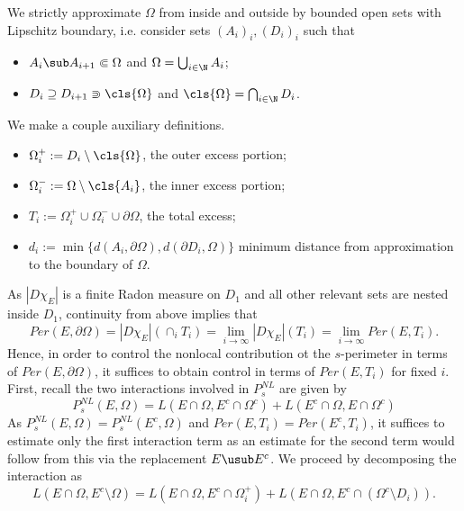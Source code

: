 \documentclass[../main.tex]{subfiles}
\begin{document}
We strictly approximate $ \Omega $ from inside and outside by bounded open sets with Lipschitz boundary, i.e. consider sets $ (A_{i})_{i}, (D_{i})_{i} $ such that
\begin{itemize}
    \item $ A_{i}\sub A_{i+1} \Subset \Omega $ and $ \Omega = \bigcup_{i\in\N}A_{i} $;
    \item $ D_{i}\supseteq D_{i+1}\Supset \cls{\Omega}  $ and $ \cls{\Omega} = \bigcap_{i\in\N}D_{i}$.
\end{itemize}
We make a couple auxiliary definitions.
\begin{itemize}
    \item $ \Omega_{i}^{+} := D_{i}\setminus \cls{\Omega} $, the outer excess portion;
    \item $ \Omega_{i}^{-} := \Omega\setminus \cls{A_{i}} $, the inner excess portion;
    \item $ T_{i}:= \Omega_{i}^{+}\cup \Omega_{i}^{-} \cup \partial \Omega $, the total excess;
    \item $ d_{i}:= \min\{d(A_{i}, \partial \Omega), d(\partial D_{i},  \Omega) \} $ minimum distance from approximation to the boundary of $ \Omega $.
\end{itemize}



\vspace{1.6mm}
As $ |D \chi_{E}| $ is a finite Radon measure on $ D_{1} $ and all other relevant sets are nested inside $ D_{1} $, continuity from above implies that
\[
    Per(E,\partial \Omega) = |D \chi_{E}|(\cap_{i} T_{i}) = \lim_{i\to\infty}|D \chi_{E}|(T_{i}) = \lim_{i\to\infty}Per(E,T_{i}).
\]
Hence, in order to control the nonlocal contribution ot the $ s $-perimeter in terms of $ Per(E,\partial \Omega) $, it suffices to obtain control in terms of $ Per(E,T_{i}) $ for fixed $ i $. First, recall the two interactions involved in $ P_{s}^{NL} $ are given by
\begin{equation}\label{nlenergydef}
    P_{s}^{NL}(E,\Omega) = L(E\cap \Omega, E^{c}\cap \Omega^{c}) + L(E^{c}\cap \Omega, E\cap \Omega^{c})
\end{equation}
As $ P_{s}^{NL}(E,\Omega) = P_{s}^{NL}(E^{c},\Omega) $ and $ Per(E,T_{i}) = Per(E^{c},T_{i}) $, it suffices to estimate only the first interaction term as an estimate for the second term would follow from this via the replacement $ E\usub E^{c} $. We proceed by decomposing the interaction as 
\begin{equation}\label{decomp1}
    L(E\cap \Omega, E^{c}\setminus\Omega) = L(E\cap \Omega, E^{c}\cap \Omega_{i}^{+}) + L(E\cap \Omega, E^{c}\cap (\Omega^{c}\setminus D_{i})).
\end{equation}
\begin{figure}[H]
    \vspace{-5mm}
    
    \vspace{-5mm}
\end{figure}
\end{document}
